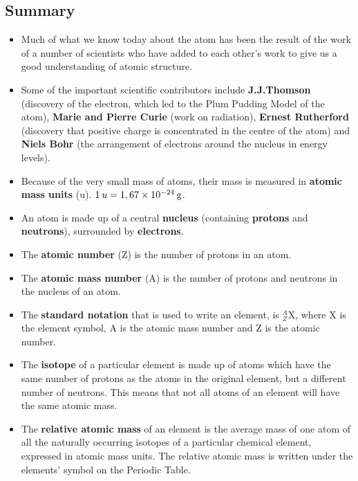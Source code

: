             \subsection*{Summary}
            \nopagebreak
      \label{m38741*id262657}\begin{itemize}[noitemsep]
            \label{m38741*uid169}\item Much of what we know today about the atom has been the result of the work of a number of scientists who have added to each other's work to give us a good understanding of atomic structure.
\label{m38741*uid170}\item Some of the important scientific contributors include \textbf{J.J.Thomson} (discovery of the electron, which led to the Plum Pudding Model of the atom), \textbf{Marie and Pierre Curie} (work on radiation), \textbf{Ernest Rutherford} (discovery that positive charge is concentrated in the centre of the atom) and \textbf{Niels Bohr} (the arrangement of electrons around the nucleus in energy levels).
\label{m38741*uid171}\item Because of the very small mass of atoms, their mass is measured in \textbf{atomic mass units} (u). $1\phantom{\rule{2pt}{0ex}}u=1,67\ensuremath{\times}10{}^{-24}\phantom{\rule{2pt}{0ex}}\text{g}$.
\label{m38741*uid172}\item An atom is made up of a central \textbf{nucleus} (containing \textbf{protons} and \textbf{neutrons}), surrounded by \textbf{electrons}.
\label{m38741*uid173}\item The \textbf{atomic number} (Z) is the number of protons in an atom.
\label{m38741*uid174}\item The \textbf{atomic mass number} (A) is the number of protons and neutrons in the nucleus of an atom.
\label{m38741*uid175}\item The \textbf{standard notation} that is used to write an element, is $_{Z}^{A}\text{X}$, where X is the element symbol, A is the atomic mass number and Z is the atomic number.
\label{m38741*uid176}\item The \textbf{isotope} of a particular element is made up of atoms which have the same number of protons as the atoms in the original element, but a different number of neutrons. This means that not all atoms of an element will have the same atomic mass.
\label{m38741*uid177}\item The \textbf{relative atomic mass} of an element is the average mass of one atom of all the naturally occurring isotopes of a particular chemical element, expressed in atomic mass units. The relative atomic mass is written under the elements' symbol on the Periodic Table.

\end{itemize}
